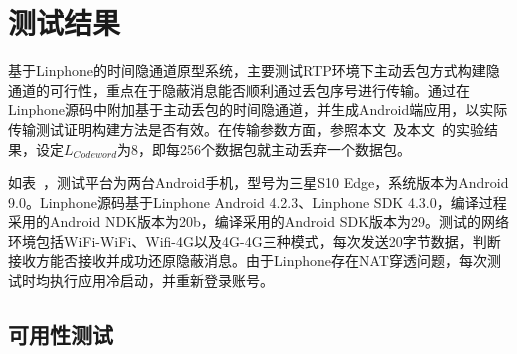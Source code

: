 \section{测试结果}
\label{chap:linphone:result}

基于Linphone的时间隐通道原型系统，主要测试RTP环境下主动丢包方式构建隐通道的可行性，重点在于隐蔽消息能否顺利通过丢包序号进行传输。通过在Linphone源码中附加基于主动丢包的时间隐通道，并生成Android端应用，以实际传输测试证明构建方法是否有效。在传输参数方面，参照本文\ 及本文\ 的实验结果，设定$L_{Codeword}$为8，即每256个数据包就主动丢弃一个数据包。


如表\ ，测试平台为两台Android手机，型号为三星S10 Edge，系统版本为Android 9.0。Linphone源码基于Linphone Android 4.2.3、Linphone SDK 4.3.0，编译过程采用的Android NDK版本为20b，编译采用的Android SDK版本为29。测试的网络环境包括WiFi-WiFi、Wifi-4G以及4G-4G三种模式，每次发送20字节数据，判断接收方能否接收并成功还原隐蔽消息。由于Linphone存在NAT穿透问题，每次测试时均执行应用冷启动，并重新登录账号。

\subsection{可用性测试}
\label{chap:linphone:result:availablity}

